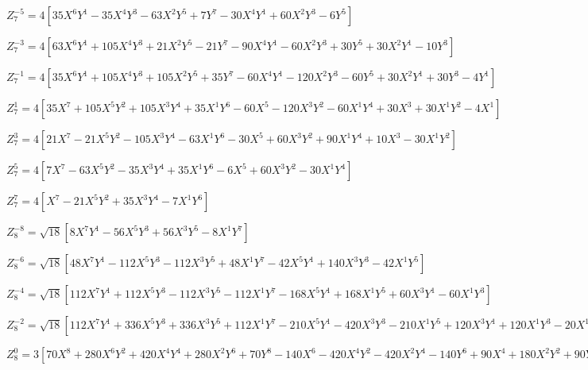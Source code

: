 \documentclass[10pt,landscape]{article}
\begin{document}
\vspace{1.2 mm}
\noindent $ Z^{-5}_{7} = 4 [35X^{6}Y^{1} -35X^{4}Y^{3} -63X^{2}Y^{5} +7Y^{7} -30X^{4}Y^{1} +60X^{2}Y^{3} -6Y^{5}] $

\vspace{1.2 mm}
\noindent $ Z^{-3}_{7} = 4 [63X^{6}Y^{1} +105X^{4}Y^{3} +21X^{2}Y^{5} -21Y^{7} -90X^{4}Y^{1} -60X^{2}Y^{3} +30Y^{5} +30X^{2}Y^{1} -10Y^{3}] $

\vspace{1.2 mm}
\noindent $ Z^{-1}_{7} = 4 [35X^{6}Y^{1} +105X^{4}Y^{3} +105X^{2}Y^{5} +35Y^{7} -60X^{4}Y^{1} -120X^{2}Y^{3} -60Y^{5} +30X^{2}Y^{1} +30Y^{3} -4Y^{1}] $

\vspace{1.2 mm}
\noindent $ Z^{1}_{7} = 4 [35X^{7} +105X^{5}Y^{2} +105X^{3}Y^{4} +35X^{1}Y^{6} -60X^{5} -120X^{3}Y^{2} -60X^{1}Y^{4} +30X^{3} +30X^{1}Y^{2} -4X^{1}] $

\vspace{1.2 mm}
\noindent $ Z^{3}_{7} = 4 [21X^{7} -21X^{5}Y^{2} -105X^{3}Y^{4} -63X^{1}Y^{6} -30X^{5} +60X^{3}Y^{2} +90X^{1}Y^{4} +10X^{3} -30X^{1}Y^{2}] $

\vspace{1.2 mm}
\noindent $ Z^{5}_{7} = 4 [7X^{7} -63X^{5}Y^{2} -35X^{3}Y^{4} +35X^{1}Y^{6} -6X^{5} +60X^{3}Y^{2} -30X^{1}Y^{4}] $

\vspace{1.2 mm}
\noindent $ Z^{7}_{7} = 4 [X^{7} -21X^{5}Y^{2} +35X^{3}Y^{4} -7X^{1}Y^{6}] $

\vspace{1.2 mm}
\noindent $ Z^{-8}_{8} = \sqrt{18} [8X^{7}Y^{1} -56X^{5}Y^{3} +56X^{3}Y^{5} -8X^{1}Y^{7}] $

\vspace{1.2 mm}
\noindent $ Z^{-6}_{8} = \sqrt{18} [48X^{7}Y^{1} -112X^{5}Y^{3} -112X^{3}Y^{5} +48X^{1}Y^{7} -42X^{5}Y^{1} +140X^{3}Y^{3} -42X^{1}Y^{5}] $

\vspace{1.2 mm}
\noindent $ Z^{-4}_{8} = \sqrt{18} [112X^{7}Y^{1} +112X^{5}Y^{3} -112X^{3}Y^{5} -112X^{1}Y^{7} -168X^{5}Y^{1} +168X^{1}Y^{5} +60X^{3}Y^{1} -60X^{1}Y^{3}] $

\vspace{1.2 mm}
\noindent $ Z^{-2}_{8} = \sqrt{18} [112X^{7}Y^{1} +336X^{5}Y^{3} +336X^{3}Y^{5} +112X^{1}Y^{7} -210X^{5}Y^{1} -420X^{3}Y^{3} -210X^{1}Y^{5} +120X^{3}Y^{1} +120X^{1}Y^{3} -20X^{1}Y^{1}] $

\vspace{1.2 mm}
\noindent $ Z^{0}_{8} = 3 [70X^{8} +280X^{6}Y^{2} +420X^{4}Y^{4} +280X^{2}Y^{6} +70Y^{8} -140X^{6} -420X^{4}Y^{2} -420X^{2}Y^{4} -140Y^{6} +90X^{4} +180X^{2}Y^{2} +90Y^{4} -20X^{2} -20Y^{2} +1] $
\end{document}

